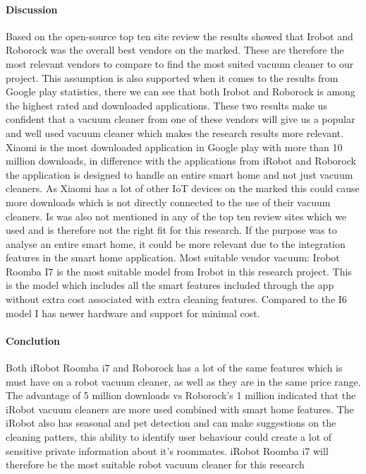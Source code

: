 \paragraph{Discussion} Based on the open-source top ten site review the results showed that Irobot and Roborock was the overall best vendors on the marked. These are therefore the most relevant vendors to compare to find the most suited vacuum cleaner to our project. This assumption is also supported when it comes to the results from Google play statistics, there we can see that both Irobot and Roborock is among the highest rated and downloaded applications. These two results make us confident that a vacuum cleaner from one of these vendors will give us a popular and well used vacuum cleaner which makes the research results more relevant. 
Xiaomi is the most downloaded application in Google play with more than 10 million downloads, in difference with the applications from iRobot and Roborock the application is designed to handle an entire smart home and not just vacuum cleaners. As Xiaomi has a lot of other IoT devices on the marked this could cause more downloads which is not directly connected to the use of their vacuum cleaners. Is was also not mentioned in any of the top ten review sites which we used and is therefore not the right fit for this research. If the purpose was to analyse an entire smart home, it could be more relevant due to the integration features in the smart home application. 
Most suitable vendor vacuum: 
Irobot Roomba I7 is the most suitable model from Irobot in this research project. This is the model which includes all the smart features included through the app without extra cost associated with extra cleaning features. Compared to the I6 model I has newer hardware and support for minimal cost. \cite{robotsel9}

\paragraph{Conclution} Both iRobot Roomba i7 and Roborock has a lot of the same features which is must have on a robot vacuum cleaner, as well as they are in the same price range. The advantage of 5 million downloads vs Roborock’s 1 million indicated that the iRobot vacuum cleaners are more used combined with smart home features. The iRobot also has seasonal and pet detection and can make suggestions on the cleaning patters, this ability to identify user behaviour could create a lot of sensitive private information about it’s roommates. iRobot Roomba i7 will therefore be the most suitable robot vacuum cleaner for this research




